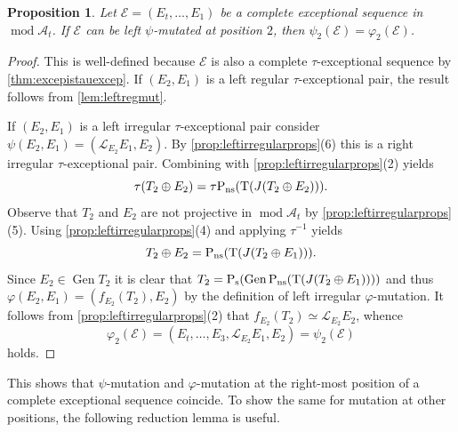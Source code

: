 \documentclass[10pt,twoside, a4paper,reqno]{amsart}
\DeclareMathOperator{\mods}{mod}
\DeclareMathOperator{\Gen}{Gen}
\newcommand{\A}{\mathscr{A}}
\newcommand{\Ecal}{\mathcal{E}}
\newcommand{\Lcal}{\mathcal{L}}
\newcommand{\Trm}{\mathrm{T}}
\newcommand{\Prm}{\mathrm{P}}
\newcommand{\nsplit}{\textnormal{ns}}
\newcommand{\ssplit}{\textnormal{s}}
\newtheorem{proposition}[theorem]{Proposition}
\theoremstyle{definition}
\begin{document}
\begin{proposition}\label{prop:leftphimut}
    Let $\Ecal = (E_t, \dots, E_1)$ be a complete exceptional sequence in $\mods \A_t$. If $\Ecal$ can be left $\psi$-mutated at position $2$, then $\psi_{2}(\Ecal) = \varphi_{2}(\Ecal)$.
\end{proposition}
\begin{proof}
    This is well-defined because $\Ecal$ is also a complete $\tau$-exceptional sequence by \cref{thm:excepistauexcep}. If $(E_2, E_1)$ is a left regular $\tau$-exceptional pair, the result follows from \cref{lem:leftregmut}. 

    If $(E_2, E_1)$ is a left irregular $\tau$-exceptional pair consider $\psi(E_2, E_1) = (\Lcal_{E_2} E_1, E_2)$. By \cref{prop:leftirregularprops}(6) this is a right irregular $\tau$-exceptional pair. Combining \cite[Prop. 3.14(e)]{BHM2024} with \cref{prop:leftirregularprops}(2) yields
    \[ \tau(T_2 \oplus E_2) = \tau \Prm_{\nsplit}(\Trm(J(T_2 \oplus E_2))). \]
    Observe that $T_2$ and $E_2$ are not projective in $\mods \A_t$ by \cref{prop:leftirregularprops}(5). Using \cref{prop:leftirregularprops}(4) and applying $\tau^{-1}$ yields
    \[ T_2 \oplus E_2 = \Prm_{\nsplit}(\Trm(J(T_2 \oplus E_1))). \]
    Since $E_2 \in \Gen T_2$ it is clear that $T_2 = \Prm_{\ssplit}(\Gen \Prm_{\nsplit}(\Trm(J(T_2 \oplus E_1))))$ and thus $\varphi(E_2, E_1) = (f_{E_2}(T_2), E_2)$ by the definition of left irregular $\varphi$-mutation. It follows from \cref{prop:leftirregularprops}(2) that $f_{E_2}(T_2) \simeq \Lcal_{E_2} E_2$, whence 
    \begin{equation}\label{eq:mutationexpression2} \varphi_{2}(\Ecal) = (E_t, \dots, E_3, \Lcal_{E_2} E_1, E_2) = \psi_{2}(\Ecal) \end{equation}
    holds. 
\end{proof}

This shows that $\psi$-mutation and $\varphi$-mutation at the right-most position of a complete exceptional sequence coincide. To show the same for mutation at other positions, the following reduction lemma is useful.
\end{document}
